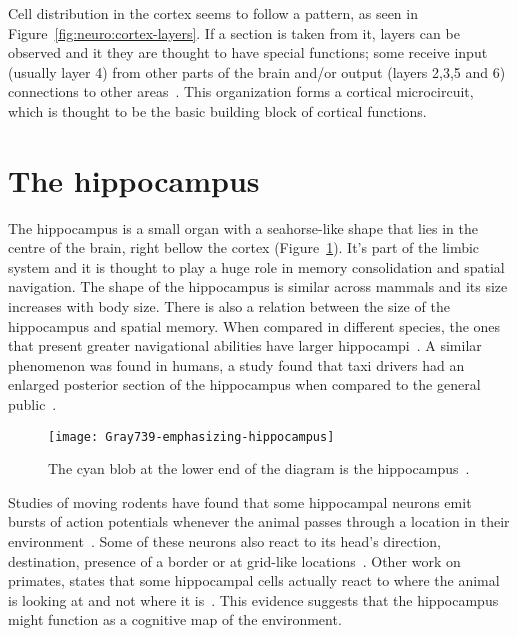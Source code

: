 Cell distribution in the cortex seems to follow a pattern, as seen in Figure~\ref{fig:neuro:cortex-layers}. If a section is taken from it,  layers can be observed and it they are thought to have special functions; some  receive input (usually layer 4) from other parts of the brain and/or output (layers 2,3,5 and 6) connections to other areas~\cite{thompson2000brain,eye-brain-vision-hubel1995}. This organization forms a cortical microcircuit, which is thought to be the basic building block of cortical functions.

\section{The hippocampus}
\label{sec:brain:hippo}
The hippocampus is a small organ with a seahorse-like shape that lies in the centre of the brain, right bellow the cortex (Figure~\ref{fig:brain:hippo}). It's part of the limbic system and it is thought to play a huge role in memory consolidation and spatial navigation.
The shape of the hippocampus is similar across mammals and its size increases with body size. There is also a relation between the size of the hippocampus and spatial memory. When compared in different species, the ones that present greater navigational abilities have larger hippocampi~\cite{jacobs2003evolution}. A similar phenomenon was found in humans, a study found that taxi drivers had an enlarged posterior section of the hippocampus when compared to the general public~\cite{taxi-maguire}.

\begin{figure}[h]
  \begin{center}
    \texttt{[image: Gray739-emphasizing-hippocampus]}
    \caption{The cyan blob at the lower end of the diagram is the hippocampus~\cite{wikipedia-images}. }
    \label{fig:brain:hippo}
  \end{center}
\end{figure}

Studies of moving rodents have found that some hippocampal neurons emit bursts of action potentials whenever the animal passes through a location in their environment~\cite{okeefe1971hippocampus}. Some of these neurons also react to its head's direction, destination, presence of a border or at grid-like locations~\cite{milford2010robot}. Other work on primates, states that some hippocampal cells actually react to where the animal is looking at and not where it is~\cite{rolls2006spatial}. This evidence suggests that the hippocampus might function as a cognitive map of the environment.

